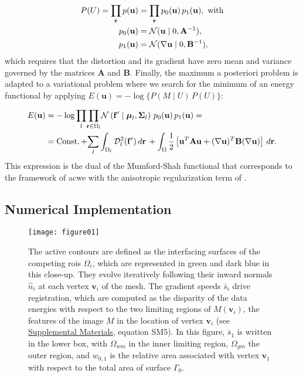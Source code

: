 \documentclass[3p,authoryear,fleqn]{elsarticle}
\DeclareMathOperator{\const}{Const.}
\providecommand{\mdist}[2]{ \mathcal{D}_{#2}^2(\mathbf{#1}) }
\renewcommand{\vec}[1]{\mathbf{#1}}
\providecommand{\suppl}[1]{\href{http://figshare.com/s/459c26b4ee8211e493b306ec4bbcf141}{Supplemental Materials}, #1}
\begin{document}
  \begin{align}
  P(U) = \underset{\vec{r}}{\prod}\, p(\vec{u}) &=
  \underset{\vec{r}}{\prod}\, p_0(\vec{u}) \, p_1(\vec{u}), \text{ with} \\
  p_0(\vec{u}) &= \mathcal{N}( \vec{u} \mid 0, \mathbf{A}^{-1}), \notag\\
  p_1(\vec{u}) &= \mathcal{N}(  \nabla \vec{u} \mid 0, \mathbf{B}^{-1}),
  \label{eq:thikonov}
  \end{align}
 which requires that the distortion and its gradient have zero
  mean and variance governed by the matrices $\mathbf{A}$ and $\mathbf{B}$.
Finally, the maximum a posteriori problem is adapted to a variational problem where we search for
  the minimum of an energy functional by applying $E(\vec{u}) = -\log \{P( M \mid U) \, P(U)\}$:

  \begin{align}
  E(\vec{u}) &= -\log \underset{l}{\prod}
  \underset{\vec{r} \in \Omega_l}{\prod}
  \mathcal{N} \left( \vec{f}' \mid \boldsymbol{\mu}_l, \boldsymbol{\Sigma}_l \right)\,p_0( \vec{u})\,p_1( \vec{u}) = \notag\\ &=
  \const + \underset{l}{\sum} \int_{\Omega_l} \mdist{f'}{l} \,d\vec{r} \, +   \int_{\Omega} \frac12 \left[ \vec{u}^T \mathbf{A} \vec{u} + (\nabla \vec{u})^T \mathbf{B} (\nabla \vec{u}) \right] \,d\vec{r}.
  \label{eq:energy}
  \end{align}
This expression is the dual of the Mumford-Shah functional that corresponds
  to the framework of \acrlong*{acwe} \citep{chan_active_2001}
  with the anisotropic regularization term of \cite{nagel_investigation_1986}.


\subsection{Numerical Implementation}
\label{sec:numerical_implementation}

\begin{figure}
  \texttt{[image: figure01]}
  \caption{The active contours are defined as the interfacing surfaces of the competing
    \glspl{roi} $\Omega_i$, which
  are represented in green and dark blue in this close-up.
  They evolve iteratively following their inward normals $\hat{n}_i$ at each vertex
    $\vec{v}_i$ of the mesh.
  The gradient speeds $\bar{s}_i$ drive registration, which are computed as the disparity of the data
    energies with respect to the two limiting regions of $M(\vec{v}_i)$, the features of the image
    $M$ in the location of vertex $\vec{v}_i$ (see \suppl{equation SM5}).
  In this figure, $\bar{s}_1$ is written in the lower
    box, with $\Omega_{wm}$ in the inner limiting region, $\Omega_{gm}$ the outer region, and
    $w_{0,1}$ is the relative area associated with vertex $\vec{v}_1$ with respect to
    the total area of surface $\Gamma_0$.
      }\label{fig:method}
\end{figure}
\end{document}
